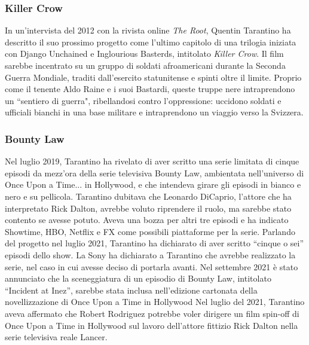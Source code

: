 \documentclass[12pt]{article} %
\begin{document}
\begin{flushleft}
\subsubsection*{Killer Crow}
In un’intervista del 2012 con la rivista online \textit{The Root}, Quentin Tarantino ha descritto il suo prossimo progetto come l’ultimo capitolo di una trilogia iniziata con Django Unchained e Inglourious Basterds, intitolato \textit{Killer Crow}. Il film sarebbe incentrato su un gruppo di soldati afroamericani durante la Seconda Guerra Mondiale, traditi dall’esercito statunitense e spinti oltre il limite.  
Proprio come il tenente Aldo Raine e i suoi Bastardi, queste truppe nere intraprendono un ``sentiero di guerra", ribellandosi contro l’oppressione: uccidono soldati e ufficiali bianchi in una base militare e intraprendono un viaggio verso la Svizzera.
\subsubsection*{Bounty Law}
Nel luglio 2019, Tarantino ha rivelato di aver scritto una serie limitata di cinque episodi da mezz'ora della serie televisiva Bounty Law, ambientata nell'universo di Once Upon a Time... in Hollywood, e che intendeva girare gli episodi in bianco e nero e su pellicola.
Tarantino dubitava che Leonardo DiCaprio, l'attore che ha interpretato Rick Dalton, avrebbe voluto riprendere il ruolo, ma sarebbe stato contento se avesse potuto. 
Aveva una bozza per altri tre episodi e ha indicato Showtime, HBO, Netflix e FX come possibili piattaforme per la serie.
Parlando del progetto nel luglio 2021, Tarantino ha dichiarato di aver scritto “cinque o sei” episodi dello show.
La Sony ha dichiarato a Tarantino che avrebbe realizzato la serie, nel caso in cui avesse deciso di portarla avanti.
Nel settembre 2021 è stato annunciato che la sceneggiatura di un episodio di Bounty Law, intitolato “Incident at Inez”, sarebbe stata inclusa nell'edizione cartonata della novellizzazione di Once Upon a Time in Hollywood
Nel luglio del 2021, Tarantino aveva affermato che Robert Rodriguez potrebbe voler dirigere un film spin-off di Once Upon a Time in Hollywood sul lavoro dell'attore fittizio Rick Dalton nella serie televisiva reale Lancer.

\end{flushleft}
\end{document}
